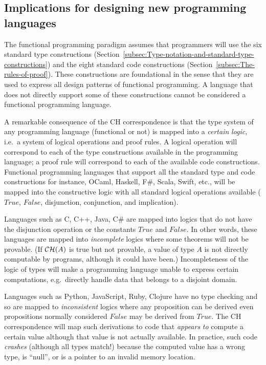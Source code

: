 \subsection{Implications for designing new programming languages}

The functional programming paradigm assumes that programmers will
use the six standard type constructions (Section~\ref{subsec:Type-notation-and-standard-type-constructions})
and the eight standard code constructions (Section~\ref{subsec:The-rules-of-proof}).
These constructions are foundational in the sense that they are used
to express all design patterns of functional programming. A language
that does not directly support some of these constructions cannot
be considered a functional programming language.

A remarkable consequence of the CH correspondence is that the type
system of any programming language (functional or not) is mapped into
a \emph{certain} \emph{logic}, i.e.~a system of logical operations
and proof rules. A logical operation will correspond to each of the
type constructions available in the programming language; a proof
rule will correspond to each of the available code constructions.
Functional programming languages that support all the standard type
and code constructions \textemdash{} for instance, OCaml, Haskell,
F\#, Scala, Swift, etc., \textemdash{} will be mapped into the constructive
logic with all standard logical operations available ($True$, $False$,
disjunction, conjunction, and implication). 

Languages such as C, C++, Java, C\# are mapped into logics that do
not have the disjunction operation or the constants $True$ and $False$.
In other words, these languages are mapped into \emph{incomplete}
logics where some theorems will not be provable. (If ${\cal CH}(A)$
is true but not provable, a value of type $A$ is not directly computable
by programs, although it could have been.) Incompleteness of the logic
of types will make a programming language unable to express certain
computations, e.g.~directly handle data that belongs to a disjoint
domain. 

Languages such as Python, JavaScript, Ruby, Clojure have no type checking
and so are mapped to \emph{inconsistent} logics where any proposition
can be derived \textemdash{} even propositions normally considered
$False$ may be derived from $True$. The CH correspondence will map
such derivations to code that \emph{appears} \emph{to} compute a certain
value although that value is not actually available. In practice,
such code \emph{crashes} (although all types match!) because the computed
value has a wrong type, is \textsf{``}null\textsf{''}, or is a pointer to an invalid
memory location.

